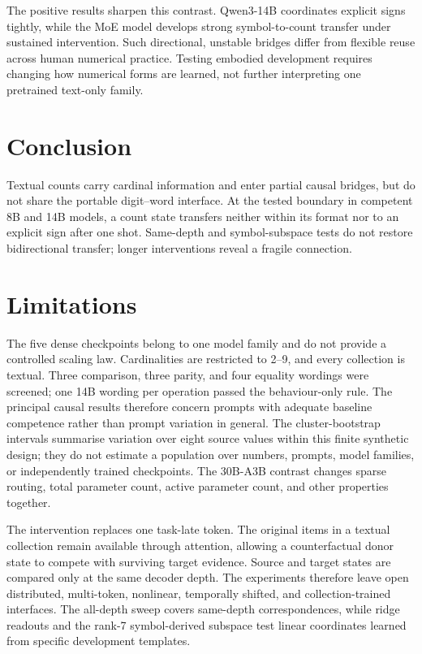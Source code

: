 \documentclass[11pt]{article}
\begin{document}
The positive results sharpen this contrast. Qwen3-14B coordinates explicit
signs tightly, while the MoE model develops strong symbol-to-count transfer
under sustained intervention. Such directional, unstable bridges differ from
flexible reuse across human numerical practice. Testing embodied development
requires changing how numerical forms are learned, not further interpreting
one pretrained text-only family.

\section{Conclusion}


Textual counts carry cardinal information and enter partial causal bridges,
but do not share the portable digit--word interface. At the tested boundary
in competent 8B and 14B models, a count state transfers neither within its
format nor to an explicit sign after one shot. Same-depth and symbol-subspace
tests do not restore bidirectional transfer; longer interventions reveal a
fragile connection.

\clearpage
\section*{Limitations}


The five dense checkpoints belong to one model family and do not provide a
controlled scaling law. Cardinalities are restricted to 2--9, and every
collection is textual. Three comparison, three parity, and four equality
wordings were screened; one 14B wording per operation passed the behaviour-only
rule. The principal causal results therefore concern prompts with adequate
baseline competence rather than prompt variation in general.
The cluster-bootstrap intervals summarise variation over eight source values
within this finite synthetic design; they do not estimate a population over
numbers, prompts, model families, or independently trained checkpoints. The
30B-A3B contrast changes sparse routing, total parameter count, active
parameter count, and other properties together.


The intervention replaces one task-late token. The original items in a
textual collection remain available through attention, allowing a
counterfactual donor state to compete with surviving target evidence. Source
and target states are compared only at the same decoder depth. The experiments
therefore leave open distributed, multi-token, nonlinear, temporally shifted,
and collection-trained interfaces. The all-depth sweep covers same-depth
correspondences, while ridge readouts and the rank-7 symbol-derived subspace
test linear coordinates learned from specific development templates.
\end{document}
